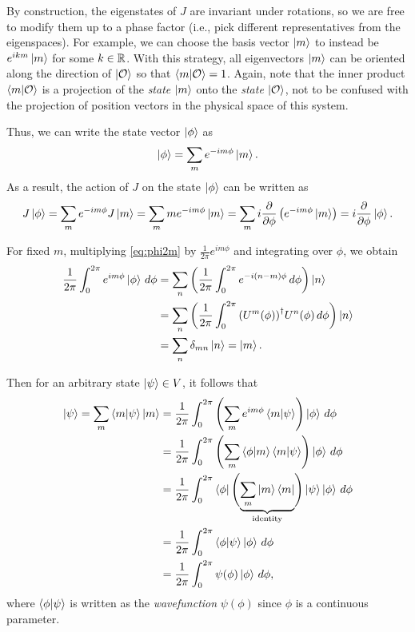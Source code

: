 By construction, the eigenstates of $J$ are invariant under rotations, so we are free to modify them up to a phase factor (i.e., pick  different representatives from the eigenspaces). For example, we can choose the basis vector $\ket{m}$ to instead be $e^{ikm}\ket{m}$ for some $k\in\mathbb{R}$.  With this strategy, all eigenvectors $\ket{m}$ can be oriented along the direction of $\ket{\mathcal{O}}$ so that $\braket{m|\mathcal{O}} = 1$. Again, note that the inner product $\braket{m|\mathcal{O}}$ is a projection of the \textit{state} $\ket{m}$ onto the \textit{state} $\ket{\mathcal{O}}$, not to be confused with the projection of position vectors in the physical space of this system.

Thus, we can write the state vector $\ket{\phi}$ as
\begin{align}
    \ket{\phi} = \sum_{m} e^{-im\phi}\ket{m}.\label{eq:phi2m}
\end{align}
As a result, the action of $J$ on the state $\ket{\phi}$ can be written as
\begin{align*}
    J\ket{\phi} = \sum_{m} e^{-im\phi} J\ket{m} = \sum_{m} m e^{-im\phi}\ket{m} = \sum_{m} i \frac{\partial}{\partial\phi} \left( e^{-im\phi}\ket{m} \right) = i\frac{\partial}{\partial\phi}\ket{\phi}.
\end{align*}

For fixed $m$, multiplying \cref{eq:phi2m} by $\frac{1}{2\pi} e^{im\phi}$ and integrating over $\phi$, we obtain
\begin{align*}
    \frac{1}{2\pi}\int_{0}^{2\pi} e^{im\phi}\ket{\phi} \,d\phi 
        &= \sum_n \left( \frac{1}{2\pi}\int_{0}^{2\pi}e^{-i(n-m)\phi}\,d\phi \right)\ket{n} \\
        &= \sum_n \left( \frac{1}{2\pi}\int_{0}^{2\pi}{(U^m(\phi))}^\dagger U^n(\phi)\,d\phi \right)\ket{n} \\
        &= \sum_n \delta_{mn}\ket{n} = \ket{m}.
\end{align*}

Then for an arbitrary state $\ket{\psi}\in V$, it follows that
\begin{align*}
    \ket{\psi} = \sum_m \braket{m|\psi}\ket{m} 
        &= \frac{1}{2\pi}\int_{0}^{2\pi} \left( \sum_m e^{im\phi}\braket{m|\psi} \right)\ket{\phi} \,d\phi \\
        &= \frac{1}{2\pi}\int_{0}^{2\pi} \left( \sum_m \braket{\phi|m}\braket{m|\psi} \right)\ket{\phi} \,d\phi \\
        &= \frac{1}{2\pi}\int_{0}^{2\pi} \bra{\phi}\Biggl( \underbrace{\sum_m \ket{m}\bra{m}}_{\textrm{identity}} \Biggr)\ket{\psi}\ket{\phi} \,d\phi \\
        &= \frac{1}{2\pi}\int_{0}^{2\pi} \braket{\phi|\psi}\ket{\phi} \,d\phi \\
        &= \frac{1}{2\pi}\int_{0}^{2\pi} \psi(\phi)\ket{\phi} \,d\phi,
\end{align*}
where $\braket{\phi|\psi}$ is written as the \textit{wavefunction} $\psi(\phi)$ since $\phi$ is a continuous parameter.

